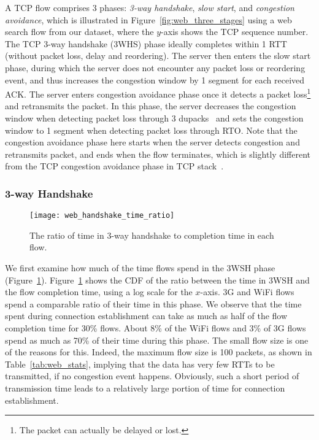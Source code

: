 A TCP flow comprises 3 phases: \emph{3-way handshake}, \emph{slow start}, and \emph{congestion avoidance}, which is illustrated in Figure~\ref{fig:web_three_stages} using a web search flow from our dataset, where the $y$-axis shows the TCP sequence number. The TCP 3-way handshake (3WHS) phase ideally completes within 1 RTT (\ie without packet loss, delay and reordering). The server then enters the slow start phase, during which the server does not encounter any packet loss or reordering event, and thus increases the congestion window by 1 segment for each received ACK. The server enters congestion avoidance phase once it detects a packet loss\footnote{The packet can actually be delayed or lost.} and retransmits the packet. In this phase, the server decreases the congestion window when detecting packet loss through 3 dupacks~\cite{rfc6675} and sets the congestion window to 1 segment when detecting packet loss through RTO. Note that the congestion avoidance phase here starts when the server detects congestion and retransmits packet, and ends when the flow terminates, which is slightly different from the TCP congestion avoidance phase in TCP stack~\cite{jacobson1988congestion}.

\subsubsection{3-way Handshake}

\begin{figure}[th]
\centering
\texttt{[image: web\_handshake\_time\_ratio]}
\caption{The ratio of time in 3-way handshake to completion time in each flow.}
\label{fig:web_handshake_ratio}
\minsqueeze
\end{figure}

We first examine how much of the time flows spend in the 3WSH phase (Figure~\ref{fig:web_handshake_ratio}). Figure~\ref{fig:web_handshake_ratio} shows the CDF of the ratio between the time in 3WSH and the flow completion time, using a log scale for the $x$-axis. 3G and WiFi flows spend a comparable ratio of their time in this phase. We observe that the time spent during connection establishment can take as much as half of the flow completion time for 30\% flows. About 8\% of the WiFi flows and 3\% of 3G flows spend as much as 70\% of their time during this phase. The small flow size is one of the reasons for this. Indeed, the maximum flow size is 100 packets, as shown in Table~\ref{tab:web_stats}, implying that the data has very few RTTs to be transmitted, if no congestion event happens. Obviously, such a short period of transmission time leads to a relatively large portion of time for connection establishment.

